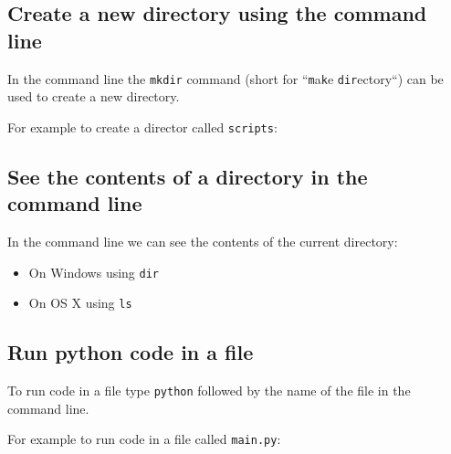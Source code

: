 \subsection{Create a new directory using the command line}
\label{\detokenize{building-tools/04-editor-and-cli/how/main:how-to-create-a-new-directory-in-the-command-line}}

In the command line the \texttt{mkdir} command (short for
``\texttt{m}a\texttt{k}e \texttt{dir}ectory``) can be
used to create a new directory.





For example to create a director called \texttt{scripts}:



\subsection{See the contents of a directory in the command line}
\label{\detokenize{building-tools/04-editor-and-cli/how/main:how-to-see-the-contents-of-a-directory-in-the-command-line}}

In the command line we can see the contents of the current directory:
\begin{itemize}
\item 

On Windows using \texttt{dir}

\item 

On OS X using \texttt{ls}

\end{itemize}




\subsection{Run python code in a file}

To run code in a file type \texttt{python} followed by the name of the file in the
command line.



For example to run code in a file called \texttt{main.py}:

